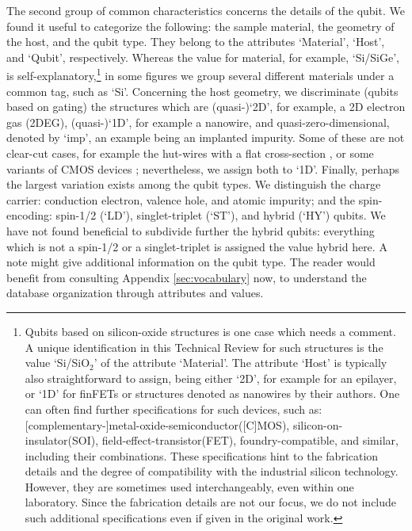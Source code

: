 \documentclass[aps, prx, showpacs, twocolumn, superscriptaddress, notitlepage, longbibliography, floatfix, nofootinbib]{revtex4-2}
\newcommand{\myKey}[1]{$\whitearrowupfrombar$\textit{#1}}
\renewcommand{\myKey}[1]{\textit{#1}}
\renewcommand{\myKey}[1]{`{#1}'}
\begin{document}
The second group of common characteristics concerns the details of the qubit. We found it useful to categorize the following: the sample material, the geometry of the host, and the qubit type. They belong to the attributes \myKey{Material}, \myKey{Host}, and \myKey{Qubit}, respectively. Whereas the value for material, for example, \myKey{Si/SiGe}, is self-explanatory,\footnote{Qubits based on silicon-oxide structures is one case which needs a comment. A unique identification in this Technical Review for such structures is the value \myKey{Si/SiO$_2$} of the attribute \myKey{Material}. The attribute \myKey{Host} is typically also straightforward to assign, being either \myKey{2D}, for example for an epilayer, or \myKey{1D} for finFETs or structures denoted as nanowires by their authors. One can often find further specifications for such devices, such as: [complementary-]metal-oxide-semiconductor([C]MOS), silicon-on-insulator(SOI), field-effect-transistor(FET), foundry-compatible, and similar, including their combinations. These specifications hint to the fabrication details and the degree of compatibility with the industrial silicon technology. However, they are sometimes used interchangeably, even within one laboratory. Since the fabrication details are not our focus, we do not include such additional specifications even if given in the original work.}
 in some figures we group several different materials under a common tag, such as \myKey{Si}. Concerning the host geometry, we discriminate (qubits based on gating) the structures which are (quasi-)\myKey{2D}, for example, a 2D electron gas (2DEG), (quasi-)\myKey{1D}, for example a nanowire, and quasi-zero-dimensional, denoted by \myKey{imp}, an example being an implanted impurity. Some of these are not clear-cut cases, for example the hut-wires with a flat cross-section \cite{watzinger_heavy-hole_2016}, or some variants of CMOS devices \cite{voisin_electrical_2016}; nevertheless, we assign both to \myKey{1D}. Finally, perhaps the largest variation exists among the qubit types. We distinguish the charge carrier: conduction electron, valence hole, and atomic impurity; and the spin-encoding: spin-1/2 (\myKey{LD}), singlet-triplet (\myKey{ST}), and hybrid (\myKey{HY}) qubits. We have not found beneficial to subdivide further the hybrid qubits: everything which is not a spin-1/2 or a singlet-triplet is assigned the value hybrid here. A note might give additional information on the qubit type. The reader would benefit from consulting Appendix \ref{sec:vocabulary} now, to understand the database organization through attributes and values.
\end{document}

